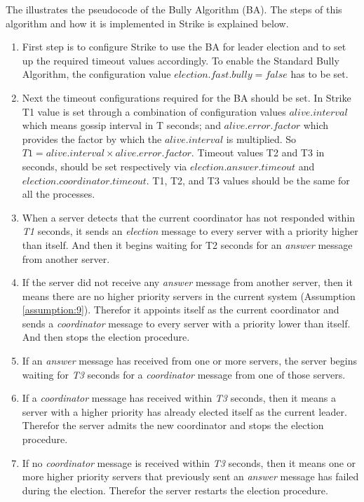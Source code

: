 \documentclass[dareport.tex]{subfiles}
\begin{document}
The  illustrates the pseudocode of the Bully Algorithm (BA). The steps of this algorithm and how it is implemented in Strike is explained below.
\begin{enumerate}[leftmargin=*]
	\item First step is to configure Strike to use the BA for leader election and to set up the required timeout values accordingly. To enable the Standard Bully Algorithm, the configuration value $election.fast.bully=false$ has to be set.
	\item Next the timeout configurations required for the BA should be set. In Strike T1 value is set through a combination of configuration values $ alive.interval $ which means gossip interval in T seconds; and $ alive.error.factor $ which provides the factor by which the $ alive.interval $ is multiplied. So $ T1= alive.interval \times alive.error.factor $. Timeout values T2 and T3 in seconds, should be set respectively via $ election.answer.timeout $ and $ election.coordinator.timeout $. T1, T2, and T3 values should be the same for all the processes.
	\item When a server detects that the current coordinator has not responded within \emph{T1} seconds, it sends an \emph{election} message to every server with a priority higher than itself. And then it begins waiting for T2 seconds for an \emph{answer} message from another server.
	\item If the server did not receive any \emph{answer} message from another server, then it means there are no higher priority servers in the current system (Assumption \ref{assumption:9}). Therefor it appoints itself as the current coordinator and sends a \emph{coordinator} message to every server with a priority lower than itself. And then stops the election procedure.
	\item If an \emph{answer} message has received from one or more servers, the server begins waiting for \emph{T3} seconds for a \emph{coordinator} message from one of those servers.
	\item If a \emph{coordinator} message has received within \emph{T3} seconds, then it means a server with a higher priority has already elected itself as the current leader. Therefor the server admits the new coordinator and stops the election procedure.
	\item If no \emph{coordinator} message is received within \emph{T3} seconds, then it means one or more higher priority servers that previously sent an \emph{answer} message has failed during the election. Therefor the server restarts the election procedure.

\end{enumerate}
\end{document}
